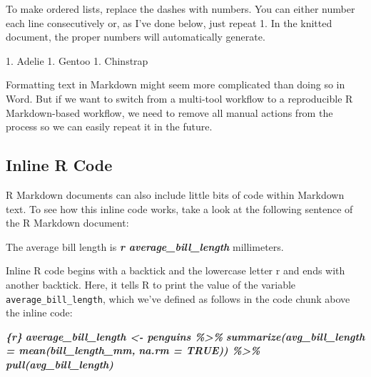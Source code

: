 \documentclass[
]{book}
\newenvironment{Shaded}{\begin{snugshade}}{\end{snugshade}}
\newcommand{\InformationTok}[1]{\textcolor[rgb]{0.56,0.35,0.01}{\textbf{\textit{#1}}}}
\newcommand{\NormalTok}[1]{#1}
\newcommand{\SpecialStringTok}[1]{\textcolor[rgb]{0.31,0.60,0.02}{#1}}
\begin{document}
To make ordered lists, replace the dashes with numbers. You can either number each line consecutively or, as I've done below, just repeat 1. In the knitted document, the proper numbers will automatically generate.

\begin{Shaded}
\begin{Highlighting}[]
\SpecialStringTok{1. }\NormalTok{Adelie}
\SpecialStringTok{1. }\NormalTok{Gentoo}
\SpecialStringTok{1. }\NormalTok{Chinstrap}
\end{Highlighting}
\end{Shaded}

Formatting text in Markdown might seem more complicated than doing so in Word. But if we want to switch from a multi-tool workflow to a reproducible R Markdown-based workflow, we need to remove all manual actions from the process so we can easily repeat it in the future.

\hypertarget{inline-r-code}{%
\subsection*{Inline R Code}\label{inline-r-code}}

R Markdown documents can also include little bits of code within Markdown text. To see how this inline code works, take a look at the following sentence of the R Markdown document:

\begin{Shaded}
\begin{Highlighting}[]
\NormalTok{The average bill length is }\InformationTok{\textasciigrave{}r average\_bill\_length\textasciigrave{}}\NormalTok{ millimeters.}
\end{Highlighting}
\end{Shaded}

Inline R code begins with a backtick and the lowercase letter r and ends with another backtick. Here, it tells R to print the value of the variable \texttt{average\_bill\_length}, which we've defined as follows in the code chunk above the inline code:

\begin{Shaded}
\begin{Highlighting}[]
\InformationTok{\textasciigrave{}\textasciigrave{}\textasciigrave{}\{r\}}
\InformationTok{average\_bill\_length \textless{}{-} penguins \%\textgreater{}\% }
\InformationTok{  summarize(avg\_bill\_length = mean(bill\_length\_mm,}
\InformationTok{                                   na.rm = TRUE)) \%\textgreater{}\% }
\InformationTok{  pull(avg\_bill\_length)}
\InformationTok{\textasciigrave{}\textasciigrave{}\textasciigrave{}}
\end{Highlighting}
\end{Shaded}
\end{document}
